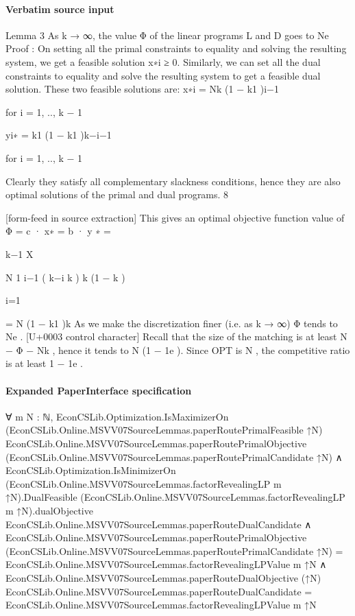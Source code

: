 \documentclass[10pt]{article}
\begin{document}
\paragraph{Verbatim source input}
\begin{ReviewVerbatim}
Lemma 3 As k → ∞, the value Φ of the linear programs L and D goes to Ne
Proof : On setting all the primal constraints to equality and solving the resulting system,
we get a feasible solution x∗i ≥ 0. Similarly, we can set all the dual constraints to equality and
solve the resulting system to get a feasible dual solution.
These two feasible solutions are:
x∗i = Nk (1 − k1 )i−1

for i = 1, .., k − 1

yi∗ = k1 (1 − k1 )k−i−1

for i = 1, .., k − 1

Clearly they satisfy all complementary slackness conditions, hence they are also optimal solutions of the primal and dual programs.
8


[form-feed in source extraction]
This gives an optimal objective function value of
Φ = c · x∗ = b · y ∗
=

k−1
X

N
1 i−1
( k−i
k ) k (1 − k )

i=1

= N (1 − k1 )k
As we make the discretization finer (i.e. as k → ∞) Φ tends to Ne .
[U+0003 control character]
Recall that the size of the matching is at least N − Φ − Nk , hence it tends to N (1 − 1e ). Since
OPT is N , the competitive ratio is at least 1 − 1e .
\end{ReviewVerbatim}


\paragraph{Expanded PaperInterface specification}
\begin{ReviewVerbatim}
∀ {m N : ℕ},
  EconCSLib.Optimization.IsMaximizerOn (EconCSLib.Online.MSVV07SourceLemmas.paperRoutePrimalFeasible ↑N)
      EconCSLib.Online.MSVV07SourceLemmas.paperRoutePrimalObjective
      (EconCSLib.Online.MSVV07SourceLemmas.paperRoutePrimalCandidate ↑N) ∧
    EconCSLib.Optimization.IsMinimizerOn (EconCSLib.Online.MSVV07SourceLemmas.factorRevealingLP m ↑N).DualFeasible
        (EconCSLib.Online.MSVV07SourceLemmas.factorRevealingLP m ↑N).dualObjective
        EconCSLib.Online.MSVV07SourceLemmas.paperRouteDualCandidate ∧
      EconCSLib.Online.MSVV07SourceLemmas.paperRoutePrimalObjective
            (EconCSLib.Online.MSVV07SourceLemmas.paperRoutePrimalCandidate ↑N) =
          EconCSLib.Online.MSVV07SourceLemmas.factorRevealingLPValue m ↑N ∧
        EconCSLib.Online.MSVV07SourceLemmas.paperRouteDualObjective (↑N)
            EconCSLib.Online.MSVV07SourceLemmas.paperRouteDualCandidate =
          EconCSLib.Online.MSVV07SourceLemmas.factorRevealingLPValue m ↑N
\end{ReviewVerbatim}
\end{document}

